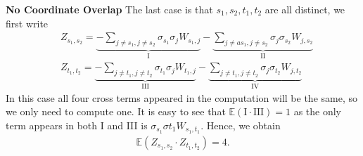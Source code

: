 \documentclass[10pt]{article}
\newcommand{\e}{\mathbb{E}}
\newenvironment{Proof of lemma}{\noindent{\bf Proof of Lemma}}{\hfill$\Box$\newline}
\newenvironment{Proof of claim}{\noindent{\bf Proof of claim}}{\hfill$\Box$\newline}
\newenvironment{Proof of theorem}{\noindent{\bf Proof of Theorem}}{\hfill\scriptsize{$\Box$}\newline}
\newenvironment{Proof of theorems}{\noindent{\bf Proof of Theorems}}{\hfill$\Box$\newline}
\newenvironment{Proof of proposition}{\noindent{\bf Proof of Proposition}}{\hfill$\Box$\newline}
\newenvironment{Proof of propositions}{\noindent{\bf Proof of Propositions}}{\hfill$\Box$\newline}
\newenvironment{Proof of exercise}{\noindent{\it Proof of Exercise:}}{\hfill$\Box$}
\numberwithin{equation}{section}
\begin{document}
\textbf{No Coordinate Overlap} The last case is that $s_1,s_2,t_1,t_2$ are all distinct, we first write
\begin{align}
    &Z_{s_1,s_2} = \underbrace{- \sum_{j \neq s_1, j \neq s_2} \sigma_{s_1} \sigma_j W_{s_1,j}}_\text{I} - \underbrace{\sum_{j \neq as_1, j \neq s_2} \sigma_j \sigma_{s_2} W_{j,s_2}}_\text{II} \\
    &Z_{t_1,t_2} = \underbrace{- \sum_{j \neq t_1, j \neq t_2} \sigma_{t_1} \sigma_j W_{t_1,j}}_\text{III} - \underbrace{\sum_{j \neq t_1, j \neq t_2} \sigma_j \sigma_{t_2} W_{j,t_2}}_\text{IV}
\end{align}
In this case all four cross terms appeared in the computation will be the same, so we only need to compute one. It is easy to see that $\e(\text{I} \cdot \text{III}) = 1$ as the only term appears in both I and III is $\sigma_{s_1} \sigma{t_1} W_{s_1,t_1}$. Hence, we obtain
\begin{align}
    \e(Z_{s_1,s_2} \cdot Z_{t_1,t_2}) = 4.
\end{align}
\end{document}
